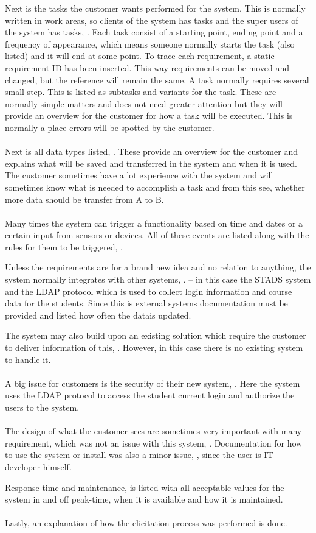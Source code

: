 \documentclass[Main]{subfiles}
\begin{document}
Next is the tasks the customer wants performed for the system.
This is normally written in work areas, so clients of the system has tasks and the super users of the system has tasks, \parencite[8-13]{HI4}.
Each task consist of a starting point, ending point and a frequency of appearance, which means someone normally starts the task (also listed) and it will end at some point.
To trace each requirement, a static requirement ID has been inserted.
This way requirements can be moved and changed, but the reference will remain the same.
A task normally requires several small step.
This is listed as subtasks and variants for the task. 
These are normally simple matters and does not need greater attention but they will provide an overview for the customer for how a task will be executed.
This is normally a place errors will be spotted by the customer.
\\
\\
Next is all data types listed, \parencite[14-17]{HI4}.
These provide an overview for the customer and explains what will be saved and transferred in the system and when it is used.
The customer sometimes have a lot experience with the system and will sometimes know what is needed to accomplish a task and from this see, whether more data should be transfer from A to B.
\\
\\
Many times the system can trigger a functionality based on time and dates or a certain input from sensors or devices.
All of these events are listed along with the rules for them to be triggered, \parencite[18]{HI4}.

Unless the requirements are for a brand new idea and no relation to anything, the system normally integrates with other systems, \parencite[19-20]{HI4}. -- in this case the STADS system and the LDAP protocol which is used to collect login information and course data for the students. 
Since this is external systems documentation must be provided and listed how often the datais updated.

The system may also build upon an existing solution which require the customer to deliver information of this, \parencite[21]{HI4}.
However, in this case there is no existing system to handle it.
\\
\\
A big issue for customers is the security of their new system, \parencite[22]{HI4}.
Here the system uses the LDAP protocol to access the student current login and authorize the users to the system.
\\
\\
The design of what the customer sees are sometimes very important with many requirement, which was not an issue with this system, \parencite[23]{HI4}.
Documentation for how to use the system or install was also a minor issue, \parencite[24]{HI4}, since the user is IT developer himself.

Response time and maintenance, \parencite[25-27]{HI4} is listed with all acceptable values for the system in and off peak-time, when it is available and how it is maintained.
\\
\\
Lastly, an explanation of how the elicitation process was performed is done.
\end{document}
